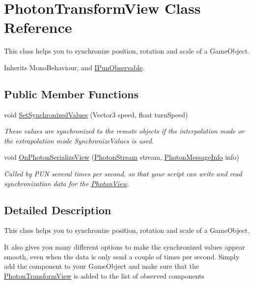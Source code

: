 \hypertarget{class_photon_transform_view}{}\section{Photon\+Transform\+View Class Reference}
\label{class_photon_transform_view}


This class helps you to synchronize position, rotation and scale of a Game\+Object.  




Inherits Mono\+Behaviour, and \hyperlink{interface_i_pun_observable}{I\+Pun\+Observable}.

\subsection*{Public Member Functions}
\begin{DoxyCompactItemize}
\item 
void \hyperlink{class_photon_transform_view_a914782b6d7ec46386636fa9fbaaa8f1f}{Set\+Synchronized\+Values} (Vector3 speed, float turn\+Speed)
\begin{DoxyCompactList}\small\item\em These values are synchronized to the remote objects if the interpolation mode or the extrapolation mode Synchronize\+Values is used. \end{DoxyCompactList}\item 
void \hyperlink{class_photon_transform_view_a5d1d6606c9c935b2326b31b292f37a7e}{On\+Photon\+Serialize\+View} (\hyperlink{class_photon_stream}{Photon\+Stream} stream, \hyperlink{class_photon_message_info}{Photon\+Message\+Info} info)
\begin{DoxyCompactList}\small\item\em Called by P\+UN several times per second, so that your script can write and read synchronization data for the \hyperlink{class_photon_view}{Photon\+View}. \end{DoxyCompactList}\end{DoxyCompactItemize}


\subsection{Detailed Description}
This class helps you to synchronize position, rotation and scale of a Game\+Object. 

It also gives you many different options to make the synchronized values appear smooth, even when the data is only send a couple of times per second. Simply add the component to your Game\+Object and make sure that the \hyperlink{class_photon_transform_view}{Photon\+Transform\+View} is added to the list of observed components 

